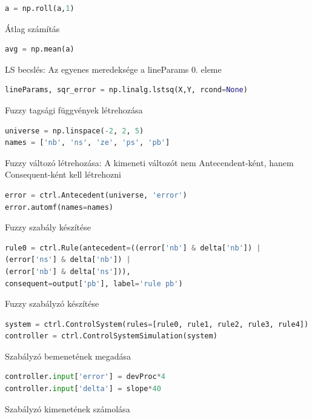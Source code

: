 \documentclass[12pt,a4paper,oneside]{report}             %
\begin{document}
\begin{lstlisting}[language=Python]
a = np.roll(a,1)
\end{lstlisting}

Átlag számítás

\begin{lstlisting}[language=Python]
avg = np.mean(a)
\end{lstlisting}

LS becslés: Az egyenes meredeksége a lineParams 0. eleme

\begin{lstlisting}[language=Python]
lineParams, sqr_error = np.linalg.lstsq(X,Y, rcond=None)
\end{lstlisting}

Fuzzy tagsági függvények létrehozása

\begin{lstlisting}[language=Python]
universe = np.linspace(-2, 2, 5)
names = ['nb', 'ns', 'ze', 'ps', 'pb']
\end{lstlisting}

Fuzzy változó létrehozása: A kimeneti változót nem Antecendent-ként, hanem Consequent-ként kell létrehozni

\begin{lstlisting}[language=Python]
error = ctrl.Antecedent(universe, 'error')
error.automf(names=names)
\end{lstlisting}

Fuzzy szabály készítése

\begin{lstlisting}[language=Python]
rule0 = ctrl.Rule(antecedent=((error['nb'] & delta['nb']) |
(error['ns'] & delta['nb']) |
(error['nb'] & delta['ns'])),
consequent=output['pb'], label='rule pb')
\end{lstlisting}

Fuzzy szabályzó készítése

\begin{lstlisting}[language=Python]
system = ctrl.ControlSystem(rules=[rule0, rule1, rule2, rule3, rule4])
controller = ctrl.ControlSystemSimulation(system)
\end{lstlisting}

Szabályzó bemenetének megadása

\begin{lstlisting}[language=Python]
controller.input['error'] = devProc*4
controller.input['delta'] = slope*40
\end{lstlisting}

Szabályzó kimenetének számolása
\end{document}
